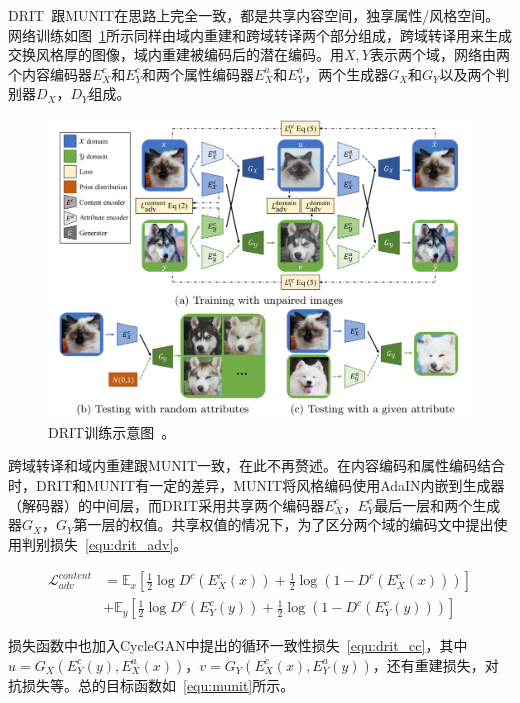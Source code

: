 DRIT~\cite{lee2018diverse}跟MUNIT在思路上完全一致，都是共享内容空间，独享属性/风格空间。网络训练如图~\ref{fig:drit}所示同样由域内重建和跨域转译两个部分组成，跨域转译用来生成交换风格厚的图像，域内重建被编码后的潜在编码。用$X, Y$表示两个域，网络由两个内容编码器$E_{X}^{c}$和$E_{Y}^{c}$和两个属性编码器$E_{X}^{a}$和$E_{Y}^{a}$，两个生成器$G_X$和$G_Y$以及两个判别器$D_X$，$D_Y$组成。

\begin{figure}[ht]
    \centering
	\includegraphics[width=\textwidth]{figures/DRIT.pdf}
	\caption{DRIT训练示意图~\cite{lee2018diverse}。}
	\label{fig:drit}
\end{figure}

跨域转译和域内重建跟MUNIT一致，在此不再赘述。在内容编码和属性编码结合时，DRIT和MUNIT有一定的差异，MUNIT将风格编码使用AdaIN内嵌到生成器（解码器）的中间层，而DRIT采用共享两个编码器$E_X^c$，$E_Y^c$最后一层和两个生成器$G_X$，$G_Y$第一层的权值。共享权值的情况下，为了区分两个域的编码文中提出使用判别损失~\ref{equ:drit_adv}。

\begin{equation}
\label{equ:drit_adv}
\begin{aligned}
\mathcal{L}_{adv}^{content} & = \mathbb{E}_x[\frac{1}{2}\log D^c(E_X^c(x))+\frac{1}{2}\log(1-D^c(E_X^c(x)))] \\
& + \mathbb{E}_y[\frac{1}{2}\log D^c(E_Y^c(y))+\frac{1}{2}\log(1-D^c(E_Y^c(y)))] 
\end{aligned}
\end{equation}

损失函数中也加入CycleGAN中提出的循环一致性损失~\ref{equ:drit_cc}，其中$u=G_X(E_Y^c(y),E_X^a(x))$，$v=G_Y(E_X^c(x),E_Y^a(y))$，还有重建损失，对抗损失等。总的目标函数如~\ref{equ:munit}所示。

